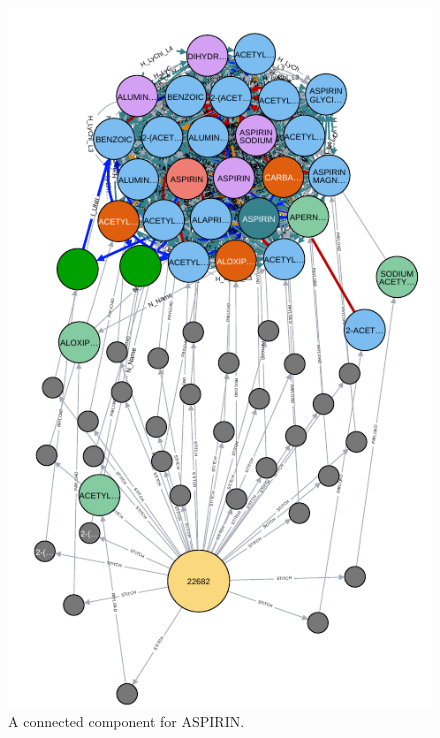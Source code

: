 \documentclass{bmcart}
\begin{document}
\begin{backmatter}
\begin{figure}[ht!]
  \caption{A connected component for ASPIRIN.}\label{fig:ASPIRIN}
  \centerline{\includegraphics[scale=0.5]{graph5-crop}}
\end{figure}


\end{backmatter}
\end{document}
